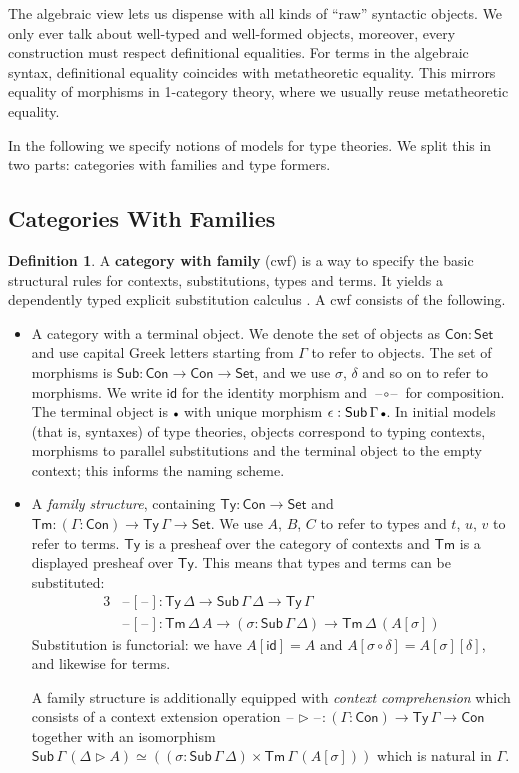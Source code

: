 \documentclass[12pt,a4paper,twoside,openany]{book}
\theoremstyle{remark}
\theoremstyle{definition}
\newtheorem{mydefinition}{Definition}
\newcommand{\id}{\mathsf{id}}
\newcommand{\Con}{\mathsf{Con}}
\newcommand{\Sub}{\mathsf{Sub}}
\newcommand{\Tm}{\mathsf{Tm}}
\newcommand{\Ty}{\mathsf{Ty}}
\newcommand{\blank}{\mathord{\hspace{1pt}\text{--}\hspace{1pt}}}
\newcommand{\Set}{\mathsf{Set}}
\newcommand{\ext}{\triangleright}
\newcommand{\emptycon}{\scaleobj{.75}\bullet}
\begin{document}
The algebraic view lets us dispense with all kinds of ``raw'' syntactic objects.
We only ever talk about well-typed and well-formed objects, moreover, every
construction must respect definitional equalities. For terms in the algebraic
syntax, definitional equality coincides with metatheoretic equality. This
mirrors equality of morphisms in 1-category theory, where we usually reuse
metatheoretic equality.

In the following we specify notions of models for type theories. We split this
in two parts: categories with families and type formers.

\subsection{Categories With Families}

\begin{mydefinition}
A \textbf{category with family} (cwf) \cite{Dybjer96internaltype} is a way to
specify the basic structural rules for contexts, substitutions, types and
terms. It yields a dependently typed explicit substitution calculus \cite{TODO}.
A cwf consists of the following.
\begin{itemize}
\item
  A category with a terminal object. We denote the set of objects as $\Con :
  \Set$ and use capital Greek letters starting from $\Gamma$ to refer to
  objects. The set of morphisms is $\Sub : \Con \to \Con \to \Set$, and we use
  $\sigma$, $\delta$ and so on to refer to morphisms. We write $\id$ for the
  identity morphism and $\blank\circ\blank$ for composition. The terminal
  object is $\emptycon$ with unique morphism $\epsilon :
  \Sub\,\Gamma\,\emptycon$. In initial models (that is, syntaxes) of type
  theories, objects correspond to typing contexts, morphisms to parallel
  substitutions and the terminal object to the empty context; this informs the
  naming scheme.
\item A \emph{family structure}, containing $\Ty : \Con \to \Set$ and $\Tm :
  (\Gamma : \Con) \to \Ty\,\Gamma \to \Set$. We use $A$, $B$, $C$ to refer to
  types and $t$, $u$, $v$ to refer to terms. $\Ty$ is a presheaf over the
  category of contexts and $\Tm$ is a displayed presheaf over $\Ty$. This means
  that types and terms can be substituted:
  \begin{alignat*}{3}
    &\blank[\blank] : \Ty\,\Delta \to \Sub\,\Gamma\,\Delta \to \Ty\,\Gamma\\
    &\blank[\blank] : \Tm\,\Delta\,A \to (\sigma : \Sub\,\Gamma\,\Delta) \to \Tm\,\Delta\,(A[\sigma])
  \end{alignat*}
  Substitution is functorial: we have $A[\id] = A$ and
  $A[\sigma\circ\delta] = A[\sigma][\delta]$, and likewise for terms.

  A family structure is additionally equipped with \emph{context comprehension}
  which consists of a context extension operation $\blank\ext\blank : (\Gamma :
  \Con) \to \Ty\,\Gamma \to \Con$ together with an isomorphism
  $\Sub\,\Gamma\,(\Delta\ext A) \simeq ((\sigma : \Sub\,\Gamma\,\Delta) \times
  \Tm\,\Gamma\,(A[\sigma]))$ which is natural in $\Gamma$.
\end{itemize}
\end{mydefinition}
\end{document}
